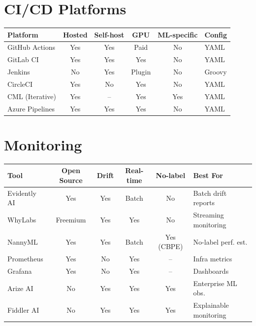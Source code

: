 \section{CI/CD Platforms}
\label{app:cicd-tools}

\begin{center}
\begin{tabular}{@{}lccccl@{}}
\toprule
\textbf{Platform} & \textbf{Hosted} & \textbf{Self-host} &
  \textbf{GPU} & \textbf{ML-specific} & \textbf{Config} \\
\midrule
GitHub Actions & Yes & Yes & Paid & No & YAML \\
GitLab CI & Yes & Yes & Yes & No & YAML \\
Jenkins & No & Yes & Plugin & No & Groovy \\
CircleCI & Yes & No & Yes & No & YAML \\
CML (Iterative) & Yes & -- & Yes & Yes & YAML \\
Azure Pipelines & Yes & Yes & Yes & No & YAML \\
\bottomrule
\end{tabular}
\end{center}

\section{Monitoring}
\label{app:monitoring-tools}

\begin{center}
\begin{tabular}{@{}lccccp{3cm}@{}}
\toprule
\textbf{Tool} & \textbf{Open Source} & \textbf{Drift} &
  \textbf{Real-time} & \textbf{No-label} & \textbf{Best For} \\
\midrule
Evidently AI & Yes & Yes & Batch & No & Batch drift reports \\
WhyLabs & Freemium & Yes & Yes & No & Streaming monitoring \\
NannyML & Yes & Yes & Batch & Yes (CBPE) & No-label perf. est. \\
Prometheus & Yes & No & Yes & -- & Infra metrics \\
Grafana & Yes & No & Yes & -- & Dashboards \\
Arize AI & No & Yes & Yes & Yes & Enterprise ML obs. \\
Fiddler AI & No & Yes & Yes & Yes & Explainable monitoring \\
\bottomrule
\end{tabular}
\end{center}

